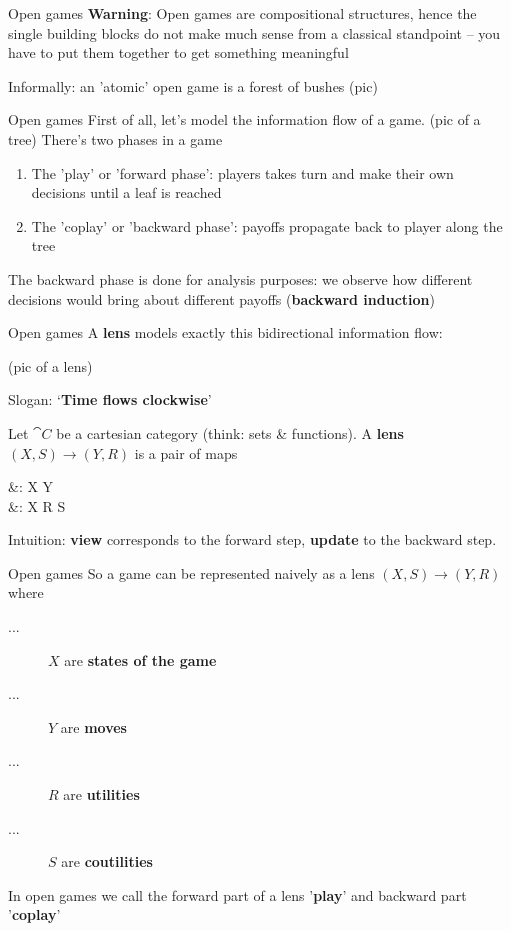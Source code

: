\begin{frame}{Open games}
	\textbf{Warning}: Open games are compositional structures, hence the single building blocks do not make much sense from a classical standpoint -- you have to put them together to get something meaningful

	\vfill
	Informally: an 'atomic' open game is a forest of bushes
	(pic)
\end{frame}

\begin{frame}{Open games}
	First of all, let's model the information flow of a game.
	(pic of a tree)
	There's two phases in a game
	\begin{enumerate}
		\item The 'play' or 'forward phase': players takes turn and make their own decisions until a leaf is reached
		\item The 'coplay' or 'backward phase': payoffs propagate back to player along the tree
	\end{enumerate}

	The backward phase is done for analysis purposes: we observe how different decisions would bring about different payoffs (\textbf{backward induction})
\end{frame}

\begin{frame}{Open games}
	A \textbf{lens} models exactly this bidirectional information flow:

	(pic of a lens)

	Slogan: `\textbf{Time flows clockwise}'

	\begin{definition}
		Let $\cat C$ be a cartesian category (think: sets \& functions). A \textbf{lens} $(X,S) \to (Y,R)$ is a pair of maps
		\begin{eqalign*}
			 &: X \to Y\\
			 &: X \times R \to S
		\end{eqalign*}
	\end{definition}

	Intuition: \textbf{view} corresponds to the forward step, \textbf{update} to the backward step.
\end{frame}

\begin{frame}{Open games}
	So a game can be represented naively as a lens $(X,S) \to (Y,R)$ where
	\begin{description}
		\item[...] $X$ are \textbf{states of the game}
		\item[...] $Y$ are \textbf{moves}
		\item[...] $R$ are \textbf{utilities}
		\item[...] $S$ are \textbf{coutilities}
	\end{description}

	In open games we call the forward part of a lens '\textbf{play}' and backward part '\textbf{coplay}'
\end{frame}

